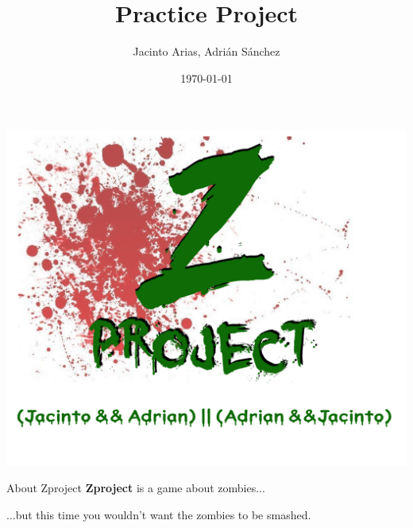 \documentclass[10pt]{beamer}
\title{Practice Project}
\author{Jacinto Arias, Adrián Sánchez}
\institute{AI in Videogames \and University of Castilla-La Mancha}
\date{\today}
\begin{document}
	\begin{frame}
		\titlepage
	\end{frame}

	\begin{frame}[plain]{}
	  \includegraphics[scale=0.2]{zlogo.png}
	\end{frame}

	\begin{frame}{About Zproject}
	   \textbf{Zproject} is a game about zombies...
	    \newline

	   ...but this time you wouldn't want the zombies to be smashed.
	\end{frame}
\end{document}
